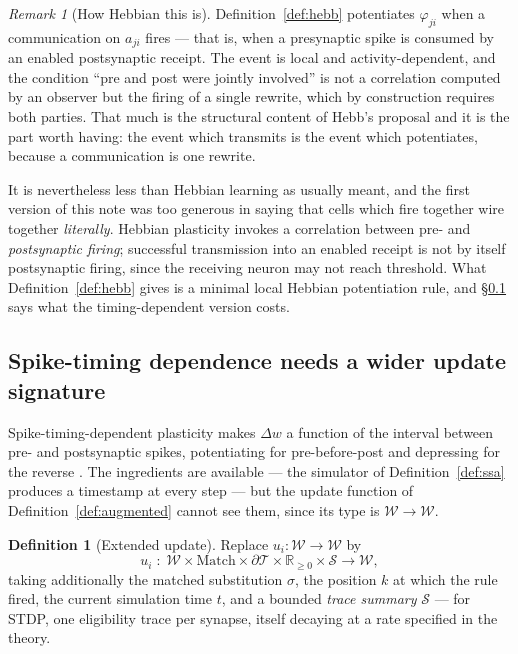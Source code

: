 \documentclass[11pt,a4paper]{article}
\theoremstyle{plain}
\theoremstyle{definition}
\newtheorem{definition}[theorem]{Definition}
\theoremstyle{remark}
\newtheorem{remark}[theorem]{Remark}
\newcommand{\Terms}{\mathcal{T}}
\newcommand{\Wt}{\mathcal{W}}
\begin{document}
\begin{remark}[How Hebbian this is]
\label{rem:hebbian}
Definition~\ref{def:hebb} potentiates $\varphi_{ji}$ when a communication on $a_{ji}$ fires --- that
is, when a presynaptic spike is consumed by an enabled postsynaptic receipt. The event is local and
activity-dependent, and the condition ``pre and post were jointly involved'' is not a correlation
computed by an observer but the firing of a single rewrite, which by construction requires both
parties. That much is the structural content of Hebb's proposal \cite{hebb} and it is the part worth
having: the event which transmits is the event which potentiates, because a communication is one
rewrite.

It is nevertheless less than Hebbian learning as usually meant, and the first version of this note
was too generous in saying that cells which fire together wire together \emph{literally}. Hebbian
plasticity invokes a correlation between pre- and \emph{postsynaptic firing}; successful transmission
into an enabled receipt is not by itself postsynaptic firing, since the receiving neuron may not
reach threshold. What Definition~\ref{def:hebb} gives is a minimal local Hebbian potentiation rule,
and \S\ref{sec:stdp} says what the timing-dependent version costs.
\end{remark}

\subsection{Spike-timing dependence needs a wider update signature}
\label{sec:stdp}

Spike-timing-dependent plasticity makes $\Delta w$ a function of the interval between pre- and
postsynaptic spikes, potentiating for pre-before-post and depressing for the reverse \cite{stdp}.
The ingredients are available --- the simulator of Definition~\ref{def:ssa} produces a timestamp at
every step --- but the update function of Definition~\ref{def:augmented} cannot see them, since its
type is $\Wt \to \Wt$.

\begin{definition}[Extended update]
\label{def:extended-update}
Replace $u_i : \Wt \to \Wt$ by
\[
u_i \;:\; \Wt \times \mathrm{Match} \times \partial\Terms \times \mathbb{R}_{\geq 0} \times \mathcal{S} \longrightarrow \Wt ,
\]
taking additionally the matched substitution $\sigma$, the position $k$ at which the rule fired, the
current simulation time $t$, and a bounded \emph{trace summary} $\mathcal{S}$ --- for STDP, one
eligibility trace per synapse, itself decaying at a rate specified in the theory.
\end{definition}
\end{document}
